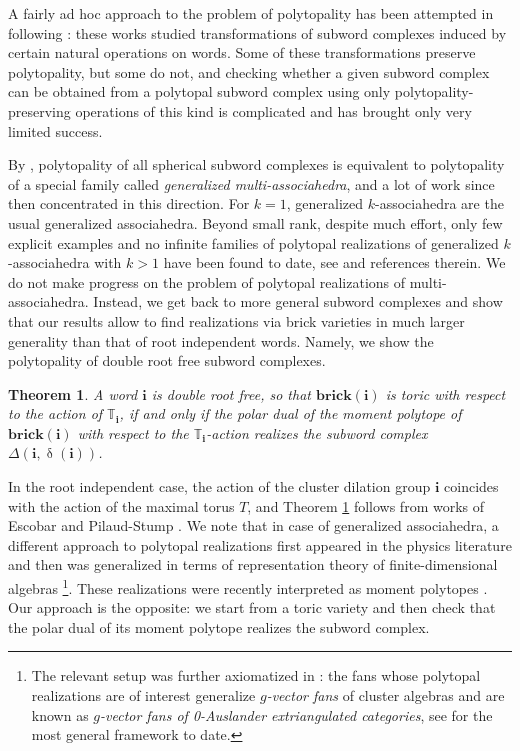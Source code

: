\documentclass[a4paper, 11pt]{amsart}
\newcommand{\brick}{\mathbf{brick}}
\newcommand{\word}[1]{\mathbf{#1}}
\DeclareMathOperator{\dem}{\delta}
\newcommand{\dil}[1]{\mathbb{T}_{#1}}
\newtheorem{theorem}{Theorem}[section]
\theoremstyle{definition}
\begin{document}
A fairly ad hoc approach to the problem of polytopality has been attempted in \cite{manneville} following \cite{gorsky_edge, G_subword_3}: these works studied transformations of subword complexes induced by certain natural operations on words. Some of these transformations preserve polytopality, but some do not, and checking whether a given subword complex can be obtained from a polytopal subword complex using only polytopality-preserving operations of this kind is complicated and has brought only very limited success.

By \cite[Corollary 2.16]{cls}, polytopality of all spherical subword complexes is equivalent to polytopality of a special family called \emph{generalized multi-associahedra}, and a lot of work since then concentrated in this direction. For $k = 1$, generalized $k$-associahedra are the usual generalized associahedra. Beyond small rank, despite much effort, only few explicit examples and no infinite families of polytopal realizations of generalized $k$-associahedra with $k > 1$ have been found to date, see \cite{CRS} and references therein. We do not make progress on the problem of polytopal realizations of multi-associahedra. Instead, we get back to more general subword complexes and show that our results allow to find realizations via brick varieties in much larger generality than that of root independent words. Namely, we show the polytopality of double root free subword complexes. 


\begin{theorem}\label{thm:subword-complex-intro}
A word $\word{i}$ is double root free, so that $\brick(\word{i})$ is toric with respect to the action of $\dil{\word{i}}$, if and only if the polar dual of the moment polytope of $\brick(\word{i})$ with respect to the $\dil{\word{i}}$-action realizes the subword complex $\Delta(\word{i}, \dem(\word{i}))$. 
\end{theorem}

In the root independent case, the action of the cluster dilation group $\word{i}$ coincides with the action of the maximal torus $T$, and Theorem \ref{thm:subword-complex-intro} follows from works of Escobar \cite{escobar} and Pilaud-Stump \cite{pilaud_stump_15}. We note that in case of generalized associahedra, a different approach to polytopal realizations first appeared in the physics literature \cite{ABHY} and then was generalized in terms of representation theory of finite-dimensional algebras \cite{BMCLDMTY, PPPP}\footnote{The relevant setup was further axiomatized in \cite{GNP2}: the fans whose polytopal realizations are of interest generalize \emph{$g$-vector fans} of cluster algebras and are known as \emph{$g$-vector fans of 0-Auslander extriangulated categories}, see \cite{BorveKaipel} for the most general framework to date.}. These realizations were recently interpreted as moment polytopes \cite{GT}. Our approach is the opposite: we start from a toric variety and then check that the polar dual of its moment polytope realizes the subword complex.
\end{document}
